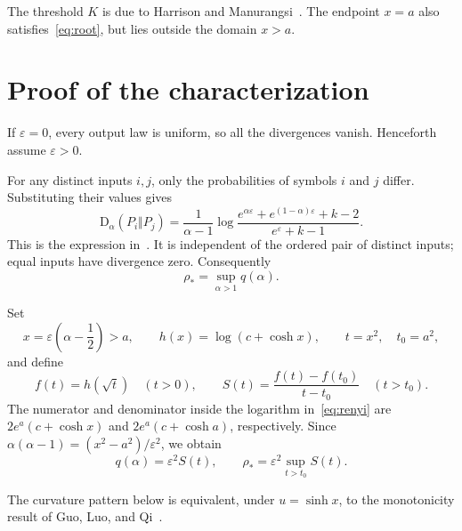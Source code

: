 \documentclass[11pt]{article}
\newcommand{\D}{\mathrm{D}}
\begin{document}
The threshold $K$ is due to Harrison and Manurangsi~\cite[Lemma~17]{HM}.
The endpoint $x=a$ also satisfies~\eqref{eq:root},
but lies outside the domain $x>a$.

\section{Proof of the characterization}

If $\varepsilon=0$, every output law is uniform, so all the divergences
vanish. Henceforth assume $\varepsilon>0$.

For any distinct inputs $i,j$, only the probabilities of symbols $i$ and $j$
differ. Substituting their values gives
\begin{equation}\label{eq:renyi}
 \D_\alpha(P_i\Vert P_j)
 =\frac{1}{\alpha-1}
 \log\frac{e^{\alpha\varepsilon}+e^{(1-\alpha)\varepsilon}+k-2}
 {e^\varepsilon+k-1}.
\end{equation}
This is the expression in~\cite[Proposition~20]{HM}. It is independent of
the ordered pair of distinct inputs; equal inputs have divergence zero.
Consequently
\begin{equation}\label{eq:sup}
 \rho_* =\sup_{\alpha>1}q(\alpha).
\end{equation}

Set
\[
 x=\varepsilon\left(\alpha-\frac12\right)>a,
 \qquad h(x)=\log(c+\cosh x),
 \qquad t=x^2,\quad t_0=a^2,
\]
and define
\[
 f(t)=h(\sqrt t)\quad(t>0),\qquad
 S(t)=\frac{f(t)-f(t_0)}{t-t_0}\quad(t>t_0).
\]
The numerator and denominator inside the logarithm
in~\eqref{eq:renyi} are $2e^a(c+\cosh x)$ and
$2e^a(c+\cosh a)$, respectively. Since
$\alpha(\alpha-1)=(x^2-a^2)/\varepsilon^2$, we obtain
\begin{equation}\label{eq:secant}
 q(\alpha)=\varepsilon^2 S(t),\qquad
 \rho_* =\varepsilon^2\sup_{t>t_0}S(t).
\end{equation}

The curvature pattern below is equivalent, under $u=\sinh x$, to the
monotonicity result of Guo, Luo, and Qi~\cite[Theorem~1]{GLQ}.
\end{document}
